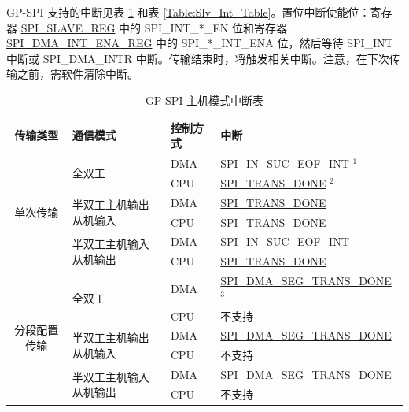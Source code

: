 \documentclass[main\_\_CN.tex]{subfiles}
\begin{document}
GP-SPI 支持的中断见表 \ref{Table:Mst_Int_Table} 和表 \ref{Table:Slv_Int_Table}。置位中断使能位：寄存器 \hyperref[regdesc:SPISLAVEREG]{SPI\_SLAVE\_REG} 中的 SPI\_INT\_*\_EN 位和寄存器 \hyperref[regdesc:SPIDMAINTENAREG]{SPI\_DMA\_INT\_ENA\_REG} 中的 SPI\_*\_INT\_ENA 位，然后等待 SPI\_INT 中断或 SPI\_DMA\_INTR 中断。传输结束时，将触发相关中断。注意，在下次传输之前，需软件清除中断。

\begin{longtable}[c]{|c|l|l|l|}
\caption{GP-SPI 主机模式中断表}
\label{Table:Mst_Int_Table}\\
\hline
\rowcolor{lightgray}
传输类型  & 通信模式 & 控制方式 & 中断 \\ \hline
\endhead
\multirow{6}{*}{单次传输} & \multirow{2}{*}{全双工} & DMA & \hyperref[int:SPIINSUCEOFINT]{SPI\_IN\_SUC\_EOF\_INT} \hyperref[spi-note1]{$^1$} \\ \cline{3-4}
&& CPU & \hyperref[fielddesc:SPITRANSDONE]{SPI\_TRANS\_DONE} \hyperref[spi-note2]{$^2$}  \\ \cline{2-4}
& \multirow{2}{*}{半双工主机输出从机输入} & DMA & \hyperref[fielddesc:SPITRANSDONE]{SPI\_TRANS\_DONE} \\ \cline{3-4}
&& CPU & \hyperref[fielddesc:SPITRANSDONE]{SPI\_TRANS\_DONE}  \\ \cline{2-4}
& \multirow{2}{*}{半双工主机输入从机输出} & DMA & \hyperref[int:SPIINSUCEOFINT]{SPI\_IN\_SUC\_EOF\_INT} \\ \cline{3-4}
&& CPU & \hyperref[fielddesc:SPITRANSDONE]{SPI\_TRANS\_DONE} \\ \hline
\multirow{6}{*}{分段配置传输} & \multirow{2}{*}{全双工} & DMA & \hyperref[fielddesc:SPIDMASEGTRANSDONE]{SPI\_DMA\_SEG\_TRANS\_DONE} \hyperref[note3]{$^3$} \\ \cline{3-4}
&& CPU & 不支持       \\ \cline{2-4}
& \multirow{2}{*}{半双工主机输出从机输入} & DMA  & \hyperref[fielddesc:SPIDMASEGTRANSDONE]{SPI\_DMA\_SEG\_TRANS\_DONE} \\ \cline{3-4}
&& CPU           & 不支持       \\ \cline{2-4}
& \multirow{2}{*}{半双工主机输入从机输出} & DMA & \hyperref[fielddesc:SPIDMASEGTRANSDONE]{SPI\_DMA\_SEG\_TRANS\_DONE} \\ \cline{3-4}
&& CPU & 不支持       \\ \hline
\end{longtable}
\end{document}
